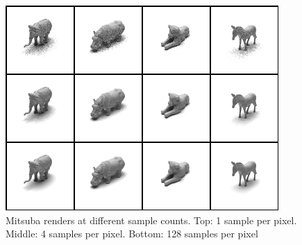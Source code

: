 \documentclass[10pt,twocolumn,letterpaper]{article}
\begin{document}
\begin{figure}[h!]
\centering
\includegraphics[width=1.0\columnwidth]{./assets/DifferentSampleCounts.png}
\caption{
Mitsuba renders at different sample counts. Top: 1 sample per pixel.  Middle: 4 samples per pixel.  Bottom: 128 samples per pixel
}
\label{fig:differentsamplesraw}
\end{figure}
\end{document}
